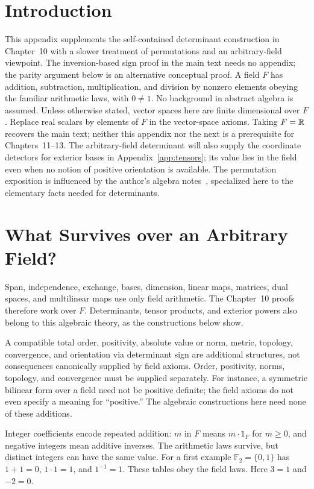 \label{app:determinants}
\section*{Introduction}
This appendix supplements the self-contained determinant construction in
Chapter~10 with a slower treatment of permutations and an arbitrary-field
viewpoint. The inversion-based sign proof in the main text needs no appendix;
the parity argument below is an alternative conceptual proof. A field $F$ has addition, subtraction, multiplication, and
division by nonzero elements obeying the familiar arithmetic laws, with
$0\ne1$. No background in abstract algebra is assumed. Unless otherwise
stated, vector spaces here are finite dimensional over $F$. Replace real
scalars by elements of $F$ in the vector-space axioms. Taking $F=\mathbb{R}$
recovers the main text; neither this appendix nor the next is a prerequisite
for Chapters~11--13.
The arbitrary-field determinant will also supply the coordinate detectors
for exterior bases in Appendix~\ref{app:tensors}; its value lies in the
field even when no notion of positive orientation is available.
The permutation exposition is influenced by the author's algebra
notes~\cite{chen-algebra}, specialized here to the elementary facts needed
for determinants.

\section{What Survives over an Arbitrary Field?}
Span, independence, exchange, bases, dimension, linear maps, matrices, dual
spaces, and multilinear maps use only field arithmetic. The Chapter~10
proofs therefore work over $F$. Determinants, tensor products, and exterior
powers also belong to this algebraic theory, as the constructions below show.

A compatible total order, positivity, absolute value or norm, metric,
topology, convergence, and orientation via determinant sign are additional
structures, not consequences canonically supplied by field axioms.
Order, positivity, norms, topology, and convergence must be supplied
separately. For instance, a symmetric bilinear form over a field need not
be positive definite; the field axioms do not even specify a meaning for
``positive.'' The algebraic constructions here need none of these additions.

Integer coefficients encode repeated addition: $m$ in $F$ means
$m\cdot1_F$ for $m\geq0$, and negative integers mean additive inverses.
The arithmetic laws survive, but distinct integers can have the same value.
For a first example $\mathbb F_2=\{0,1\}$ has $1+1=0$, $1\cdot1=1$,
and $1^{-1}=1$. These tables obey the field laws. Here $3=1$ and $-2=0$.

